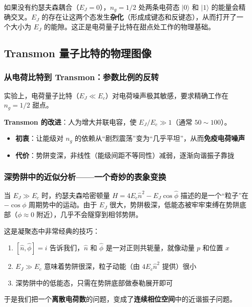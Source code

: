 \begin{insightbox}[物理图像]
如果没有约瑟夫森耦合（$E_J=0$），$n_g=1/2$ 处两条电荷态 $|0\rangle$ 和 $|1\rangle$ 的能量会精确交叉。$E_J$ 的存在让这两个态发生\textbf{杂化}（形成成键态和反键态），从而打开了一个大小为 $E_J$ 的能隙。这正是电荷量子比特在甜点处工作的物理基础。
\end{insightbox}

\subsection{Transmon 量子比特的物理图像}

\subsubsection{从电荷比特到 Transmon：参数比例的反转}

实验上，电荷量子比特（$E_J \ll E_c$）对电荷噪声极其敏感，要求精确工作在 $n_g=1/2$ 甜点。

\textbf{Transmon 的改进}：人为增大并联电容，使 $E_J/E_c \gg 1$（通常 $50 \sim 100$）。
\begin{itemize}[nosep]
    \item \textbf{初衷}：让能级对 $n_g$ 的依赖从``剧烈震荡''变为``几乎平坦''，从而\textbf{免疫电荷噪声}
    \item \textbf{代价}：势阱变深，非线性（能级间距不等同性）减弱，逐渐向谐振子靠拢
\end{itemize}

\subsubsection{深势阱中的近似分析——一个奇妙的表象变换}

当 $E_J \gg E_c$ 时，约瑟夫森哈密顿量 $H = 4E_c \hat{n}^2 - E_J \cos\hat{\phi}$ 描述的是一个``粒子''在 $-\cos\phi$ 周期势中的运动。由于 $E_J$ 很大，势阱极深，低能态被牢牢束缚在势阱底部（$\phi \approx 0$ 附近），几乎不会隧穿到相邻势阱。

\begin{insightbox}
这是凝聚态中非常经典的技巧：
\begin{enumerate}[nosep]
    \item $[\hat{n}, \hat{\phi}] = i$ 告诉我们，$\hat{n}$ 和 $\hat{\phi}$ 是一对正则共轭量，就像动量 $p$ 和位置 $x$
    \item $E_J \gg E_c$ 意味着势阱很深，粒子动能（由 $4E_c \hat{n}^2$ 提供）很小
    \item 深势阱中的低能态，只需在势阱底部做泰勒展开即可
\end{enumerate}
于是我们把一个\textbf{离散电荷数}的问题，变成了\textbf{连续相位空间}中的近谐振子问题。
\end{insightbox}

